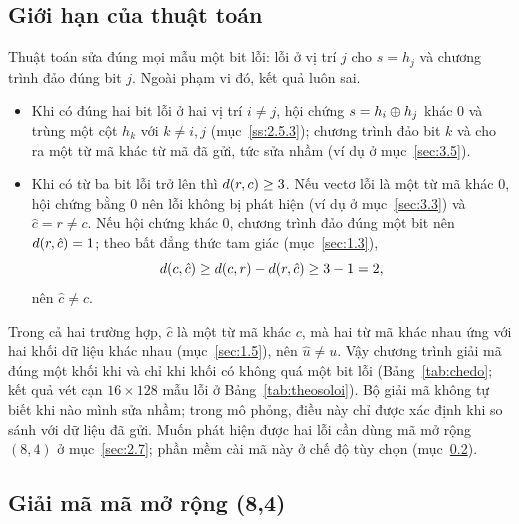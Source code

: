 \subsection{Giới hạn của thuật toán}
\label{ss:4.3.5}

Thuật toán sửa đúng mọi mẫu một bit lỗi: lỗi ở vị trí $j$ cho $s = h_j$ và
chương trình đảo đúng bit $j$. Ngoài phạm vi đó, kết quả luôn sai.
\begin{itemize}
  \item Khi có đúng hai bit lỗi ở hai vị trí $i \neq j$, hội chứng
        $s = h_i \oplus h_j$ khác $0$ và trùng một cột $h_k$ với $k \neq i, j$
        (mục~\ref{ss:2.5.3}); chương trình đảo bit $k$ và cho ra một từ mã khác
        từ mã đã gửi, tức sửa nhầm (ví dụ ở mục~\ref{sec:3.5}).
  \item Khi có từ ba bit lỗi trở lên thì $d(r,c) \ge 3$. Nếu vectơ lỗi là
        một từ mã khác $0$, hội chứng bằng $0$ nên lỗi không bị phát hiện (ví
        dụ ở mục~\ref{sec:3.3}) và $\hat{c} = r \neq c$. Nếu hội chứng khác
        $0$, chương trình đảo đúng một bit nên $d(r,\hat{c}) = 1$; theo bất
        đẳng thức tam giác (mục~\ref{sec:1.3}),
        \[
          d(c,\hat{c}) \ge d(c,r) - d(r,\hat{c}) \ge 3 - 1 = 2,
        \]
        nên $\hat{c} \neq c$.
\end{itemize}
Trong cả hai trường hợp, $\hat{c}$ là một từ mã khác $c$, mà hai từ mã khác nhau
ứng với hai khối dữ liệu khác nhau (mục~\ref{sec:1.5}), nên $\hat{u} \neq u$.
Vậy chương trình giải mã đúng một khối khi và chỉ khi khối có không quá một bit
lỗi (Bảng~\ref{tab:chedo}; kết quả vét cạn $16 \times 128$ mẫu lỗi ở
Bảng~\ref{tab:theosoloi}). Bộ giải mã không tự biết khi nào mình sửa nhầm;
trong mô phỏng, điều này chỉ được xác định khi so sánh với dữ liệu đã gửi. Muốn
phát hiện được hai lỗi cần dùng mã mở rộng $(8,4)$ ở mục~\ref{sec:2.7}; phần
mềm cài mã này ở chế độ tùy chọn (mục~\ref{ss:4.3.6}).

\subsection{Giải mã mã mở rộng (8,4)}
\label{ss:4.3.6}

